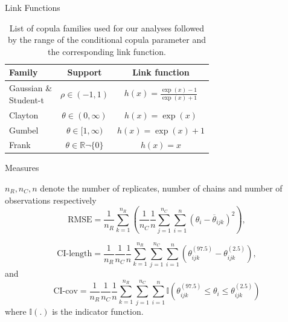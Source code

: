\documentclass[11pt]{beamer}
\begin{document}
    \begin{frame}{Link Functions}
    \begin{table}[H]
	\centering
	\begin{tabular}{l|c|c}
		Family & Support & Link function\\
		\midrule
		\thead{Gaussian \& \\
		Student-t} & $\rho \in (-1,1)$ & $h(x)=\frac{\exp(x)-1}{\exp(x)+1}$\\
		Clayton & $\theta \in (0,\infty)$ & $h(x)=\exp(x)$\\
		Gumbel & $\theta\in [1,\infty)$ & $h(x)=\exp(x)+1$\\
		Frank & $\theta\in \mathbb{R}\neg \{0\}$ & $h(x)=x$\\
		\end{tabular}
	\caption{List of copula families used for our analyses followed by the range of the conditional copula parameter and the corresponding link function.}
	\label{tab:cop:link}
\end{table}

        
    \end{frame}

    \begin{frame}{Measures}

    $n_R, n_C, n$ denote the number of replicates, number of chains and number of observations respectively
        \begin{equation*}
	\text{RMSE} = \frac{1}{n_R}\sum_{k=1}^{n_R}\left(\frac{1}{n_C}\frac{1}{n}\sum_{j=1}^{n_C}\sum_{i=1}^{n}\left(\theta_i - \overline{\theta}_{ijk}\right)^2\right),
\end{equation*}

\begin{equation*}
	\text{CI-length} = \frac{1}{n_R}\frac{1}{n_C}\frac{1}{n}\sum_{k=1}^{n_R}\sum_{j=1}^{n_C}\sum_{i=1}^{n}\left({\theta}^{(97.5)}_{ijk}-{\theta}^{(2.5)}_{ijk}\right),
\end{equation*}
and
\begin{equation*}
	\text{CI-cov} = \frac{1}{n_R}\frac{1}{n_C}\frac{1}{n}\sum_{k=1}^{n_R}\sum_{j=1}^{n_C}\sum_{i=1}^{n}\mathbb{I}\left({\theta}^{(97.5)}_{ijk}\le\theta_i\le {\theta}^{(2.5)}_{ijk}\right)
\end{equation*}
where $\mathbb{I}(.)$ is the indicator function.
    \end{frame}
\end{document}
